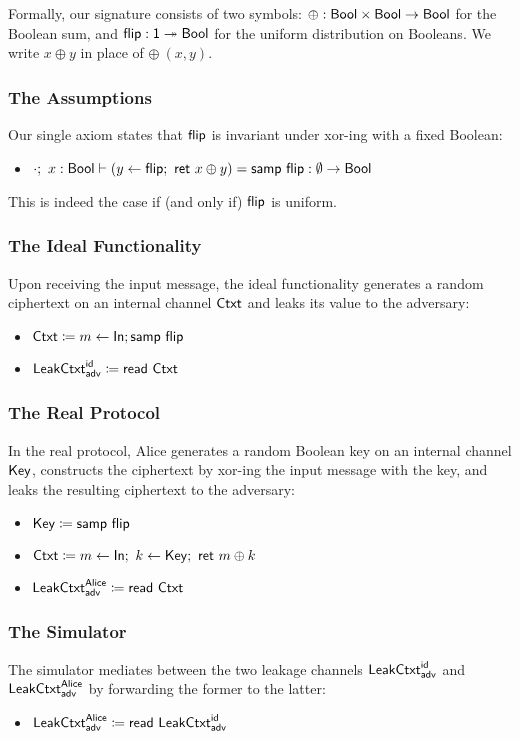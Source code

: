 Formally, our signature consists of two symbols: $\oplus : \mathsf{Bool} \times \mathsf{Bool} \to \mathsf{Bool}$ for the Boolean sum, and $\mathsf{flip} : \mathsf{1} \twoheadrightarrow \mathsf{Bool}$ for the uniform distribution on Booleans. We write $x \oplus y$ in place of $\oplus \ (x,y)$.

\subsubsection{The Assumptions}
Our single axiom states that $\mathsf{flip}$ is invariant under xor-ing with a fixed Boolean:
\begin{itemize}
\item $\cdot; \ x : \mathsf{Bool} \vdash (y \leftarrow \mathsf{flip}; \ \mathsf{ret} \ x \oplus y) = \mathsf{samp} \ \mathsf{flip} : \emptyset \to \mathsf{Bool}$
\end{itemize}
This is indeed the case if (and only if) $\mathsf{flip}$ is uniform.

\subsubsection{The Ideal Functionality}
Upon receiving the input message, the ideal functionality generates a random ciphertext on an internal channel $\mathsf{Ctxt}$ and leaks its value to the adversary:
\begin{itemize}
\item $\mathsf{Ctxt} \coloneqq m \leftarrow \mathsf{In}; \mathsf{samp} \ \mathsf{flip}$ 
\item $\mathsf{LeakCtxt}^{\mathsf{id}}_{\mathsf{adv}} \coloneqq \mathsf{read} \ \mathsf{Ctxt}$
\end{itemize}

\subsubsection{The Real Protocol}
In the real protocol, Alice generates a random Boolean key on an internal channel $\mathsf{Key}$, constructs the ciphertext by xor-ing the input message with the key, and leaks the resulting ciphertext to the adversary:
\begin{itemize}
\item $\mathsf{Key} \coloneqq \mathsf{samp} \ \mathsf{flip}$
\item $\mathsf{Ctxt} \coloneqq m \leftarrow \mathsf{In}; \ k \leftarrow \mathsf{Key}; \ \mathsf{ret} \ m \oplus k$
\item $\mathsf{LeakCtxt}^{\mathsf{Alice}}_{\mathsf{adv}} \coloneqq \mathsf{read} \ \mathsf{Ctxt}$
\end{itemize}

\subsubsection{The Simulator}
The simulator mediates between the two leakage channels $\mathsf{LeakCtxt}^{\mathsf{id}}_{\mathsf{adv}}$ and $\mathsf{LeakCtxt}^{\mathsf{Alice}}_{\mathsf{adv}}$ by forwarding the former to the latter:
\begin{itemize}
\item $\mathsf{LeakCtxt}^{\mathsf{Alice}}_{\mathsf{adv}} \coloneqq \mathsf{read} \ \mathsf{LeakCtxt}^{\mathsf{id}}_{\mathsf{adv}}$
\end{itemize}


